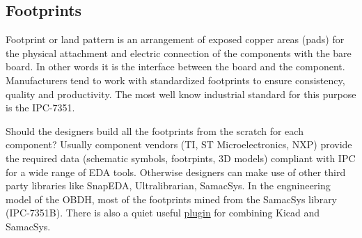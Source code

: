 \documentclass[final]{cubedoc}
\begin{document}
	\subsection{Footprints}
	
	
	
	
	Footprint or land pattern is an arrangement of exposed copper areas (pads) for the physical attachment and electric connection of the components with the bare board. In other words it is the interface between the board and the component. Manufacturers tend to work with standardized footprints to ensure consistency, quality and productivity. The most well know industrial standard for this purpose is the IPC-7351. 
	
	Should the designers build all the footprints from the scratch for each component? Usually component vendors (TI, ST Microelectronics, NXP) provide the required data (schematic symbols, footrpints, 3D models) compliant with IPC for a wide range of EDA tools. Otherwise designers can make use of other third party libraries like SnapEDA, Ultralibrarian, SamacSys. In the engnineering model of the OBDH, most of the footprints mined from the SamacSys library (IPC-7351B). There is also a quiet useful \href{https://www.samacsys.com/kicad-libraries/}{plugin} for combining Kicad and SamacSys.
	
\end{document}
